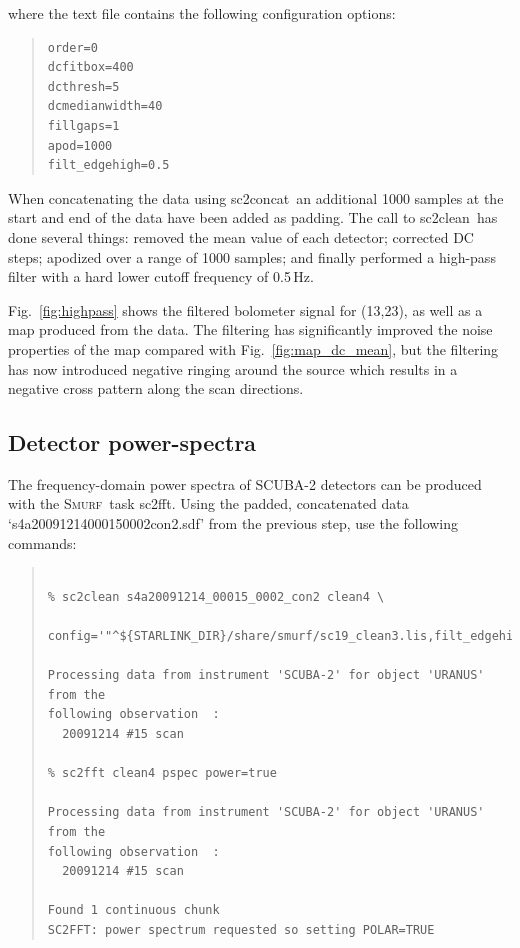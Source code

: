 \documentclass[twoside,11pt]{article}
\newenvironment{myquote}{\begin{quote}\begin{small}}{\end{small}\end{quote}}
\newcommand{\smurf}{\xref{\textsc{Smurf}}{sun258}{}}
\newcommand{\task}[1]{\textsf{#1}}
\newcommand{\concat}{\xref{\task{sc2concat}}{sun258}{SC2CONCAT}}
\newcommand{\fft}{\xref{\task{sc2fft}}{sun258}{SC2FFT}}
\newcommand{\clean}{\xref{\task{sc2clean}}{sun258}{SC2CLEAN}}
\newcommand{\xref}[3]{#1}
\newcommand{\xlabel}[1]{}
\renewcommand{\_}{\texttt{\symbol{95}}}
\begin{document}
where the text file contains the following configuration options:

\begin{myquote}
\begin{verbatim}
order=0
dcfitbox=400
dcthresh=5
dcmedianwidth=40
fillgaps=1
apod=1000
filt_edgehigh=0.5
\end{verbatim}
\end{myquote}

When concatenating the data using \concat\ an additional 1000 samples
at the start and end of the data have been added as padding. The call
to \clean\ has done several things: removed the mean value of each
detector; corrected DC steps; apodized over a range of 1000 samples;
and finally performed a high-pass filter with a hard lower cutoff
frequency of 0.5\,Hz.

Fig.~\ref{fig:highpass} shows the filtered bolometer signal for
(13,23), as well as a map produced from the data. The filtering has
significantly improved the noise properties of the map compared with
Fig.~\ref{fig:map_dc_mean}, but the filtering has now introduced
negative ringing around the source which results in a negative cross
pattern along the scan directions.

\subsection{\xlabel{pspec}Detector power-spectra}

The frequency-domain power spectra of SCUBA-2 detectors can be
produced with the \smurf\ task \fft. Using the padded, concatenated
data `s4a20091214\_00015\_0002\_con2.sdf' from the previous step, use the
following commands:

\begin{myquote}
\begin{verbatim}

% sc2clean s4a20091214_00015_0002_con2 clean4 \
   config='"^${STARLINK_DIR}/share/smurf/sc19_clean3.lis,filt_edgehigh=0"'

Processing data from instrument 'SCUBA-2' for object 'URANUS' from the
following observation  :
  20091214 #15 scan

% sc2fft clean4 pspec power=true

Processing data from instrument 'SCUBA-2' for object 'URANUS' from the
following observation  :
  20091214 #15 scan

Found 1 continuous chunk
SC2FFT: power spectrum requested so setting POLAR=TRUE

\end{verbatim}
\end{myquote}
\end{document}

